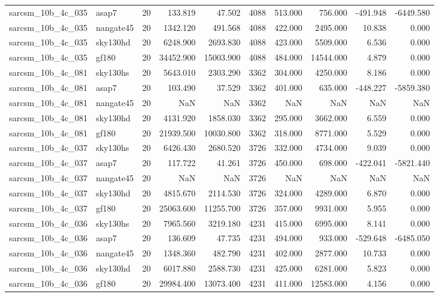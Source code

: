 \begin{longtable}{llrrrrrrrr}
sarcsm\_10b\_4c\_035 & asap7 & 20 & 133.819 & 47.502 & 4088 & 513.000 & 756.000 & -491.948 & -6449.580 \\
sarcsm\_10b\_4c\_035 & nangate45 & 20 & 1342.120 & 491.568 & 4088 & 422.000 & 2495.000 & 10.838 & 0.000 \\
sarcsm\_10b\_4c\_035 & sky130hd & 20 & 6248.900 & 2693.830 & 4088 & 423.000 & 5509.000 & 6.536 & 0.000 \\
sarcsm\_10b\_4c\_035 & gf180 & 20 & 34452.900 & 15003.900 & 4088 & 484.000 & 14544.000 & 4.879 & 0.000 \\
sarcsm\_10b\_4c\_081 & sky130hs & 20 & 5643.010 & 2303.290 & 3362 & 304.000 & 4250.000 & 8.186 & 0.000 \\
sarcsm\_10b\_4c\_081 & asap7 & 20 & 103.490 & 37.529 & 3362 & 401.000 & 635.000 & -448.227 & -5859.380 \\
sarcsm\_10b\_4c\_081 & nangate45 & 20 & NaN & NaN & 3362 & NaN & NaN & NaN & NaN \\
sarcsm\_10b\_4c\_081 & sky130hd & 20 & 4131.920 & 1858.030 & 3362 & 295.000 & 3662.000 & 6.559 & 0.000 \\
sarcsm\_10b\_4c\_081 & gf180 & 20 & 21939.500 & 10030.800 & 3362 & 318.000 & 8771.000 & 5.529 & 0.000 \\
sarcsm\_10b\_4c\_037 & sky130hs & 20 & 6426.430 & 2680.520 & 3726 & 332.000 & 4734.000 & 9.039 & 0.000 \\
sarcsm\_10b\_4c\_037 & asap7 & 20 & 117.722 & 41.261 & 3726 & 450.000 & 698.000 & -422.041 & -5821.440 \\
sarcsm\_10b\_4c\_037 & nangate45 & 20 & NaN & NaN & 3726 & NaN & NaN & NaN & NaN \\
sarcsm\_10b\_4c\_037 & sky130hd & 20 & 4815.670 & 2114.530 & 3726 & 324.000 & 4289.000 & 6.870 & 0.000 \\
sarcsm\_10b\_4c\_037 & gf180 & 20 & 25063.600 & 11255.700 & 3726 & 357.000 & 9931.000 & 5.955 & 0.000 \\
sarcsm\_10b\_4c\_036 & sky130hs & 20 & 7965.560 & 3219.180 & 4231 & 415.000 & 6995.000 & 8.141 & 0.000 \\
sarcsm\_10b\_4c\_036 & asap7 & 20 & 136.609 & 47.735 & 4231 & 494.000 & 933.000 & -529.648 & -6485.050 \\
sarcsm\_10b\_4c\_036 & nangate45 & 20 & 1348.360 & 482.790 & 4231 & 402.000 & 2877.000 & 10.733 & 0.000 \\
sarcsm\_10b\_4c\_036 & sky130hd & 20 & 6017.880 & 2588.730 & 4231 & 425.000 & 6281.000 & 5.823 & 0.000 \\
sarcsm\_10b\_4c\_036 & gf180 & 20 & 29984.400 & 13073.400 & 4231 & 411.000 & 12583.000 & 4.156 & 0.000 \\

\end{longtable}
